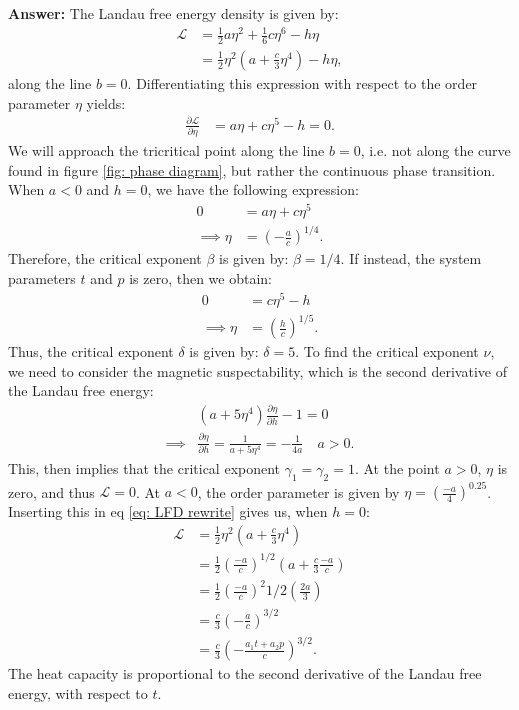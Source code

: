 \documentclass[a4paper]{article}
\newcommand{\newparagraph}{\vspace{.5cm}\noindent}
\newcommand{\fpartial}[2]{\frac{\partial #1}{\partial #2}}
\begin{document}
\newparagraph
\textbf{Answer: }The Landau free energy density is given by:
\begin{align}
    \mathcal{L} &= \frac{1}{2}a\eta^2 + \frac{1}{6}c\eta^6 - h\eta\nonumber\\
    &= \frac{1}{2}\eta^2\left(a + \frac{c}{3}\eta^4\right) - h\eta,\label{eq: LFD rewrite}
\end{align}along the line $b = 0$. Differentiating this expression with respect to the order parameter $\eta$ yields:
\begin{align}
    \fpartial{\mathcal{L}}{\eta} &= a\eta + c\eta^5 - h = 0. \label{eq: LFD b = 0}
\end{align}We will approach the tricritical point along the line $b = 0$, i.e. not along the curve found in figure \ref{fig: phase diagram}, but rather the continuous phase transition. 
When $a<0$ and $h = 0$, we have the following expression:
\begin{align*}
    0 &= a\eta + c\eta^5\\
    \implies \eta &= \left(-\frac{a}{c}\right)^{1/4}.
\end{align*}Therefore, the critical exponent $\beta$ is given by: $\beta = 1/4$. If instead, the system parameters $t$ and $p$ is zero, then we obtain:
\begin{align*}
    0 &= c\eta^5 - h\\
    \implies \eta &= \left(\frac{h}{c}\right)^{1/5}.
\end{align*}Thus, the critical exponent $\delta$ is given by: $\delta = 5$.
To find the critical exponent $\nu$, we need to consider the magnetic suspectability, which is the second derivative of the Landau free energy:
\begin{align*}
    &\left(a + 5 \eta^4\right)\frac{\partial \eta}{\partial h} - 1 = 0\\
    \implies &\frac{\partial \eta}{\partial h} = \frac{1}{a + 5 \eta^4} = -\frac{1}{4a}\quad a>0.
\end{align*}This, then implies that the critical exponent $\gamma_1 = \gamma_2 = 1$. At the point $a>0$, $\eta$ is zero, and thus $\mathcal{L} = 0$. At $a<0$, the order parameter is given by $\eta = \left(\frac{-a}{4}\right)^{0.25}$.
Inserting this in eq \eqref{eq: LFD rewrite} gives us, when $h = 0$:
\begin{align*}
    \mathcal{L} &= \frac{1}{2}\eta^2 \left(a + \frac{c}{3}\eta^{4}\right)\\
    &= \frac{1}{2}\left(\frac{-a}{c}\right)^{1/2}\left(a + \frac{c}{3}\frac{-a}{c}\right)\\
    &= \frac{1}{2}\left(\frac{-a}{c}\right)^2{1/2} \left(\frac{2a}{3}\right)\\
    &= \frac{c}{3}\left(-\frac{a}{c}\right)^{3/2}\\
    &= \frac{c}{3}\left(-\frac{a_1t + a_2p}{c}\right)^{3/2}.
\end{align*}The heat capacity is proportional to the second derivative of the Landau free energy, with respect to $t$.
\end{document}
